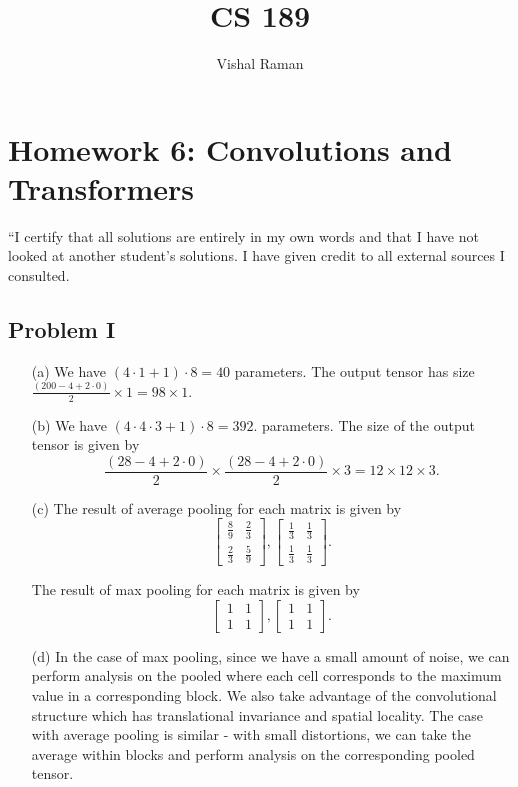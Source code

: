\documentclass[11pt]{scrartcl}
\begin{document}
\title{CS 189}
\author{Vishal Raman}

\section{Homework 6: Convolutions and Transformers}
“I certify that all solutions are entirely in my own words and that I have not looked at another student’s solutions. I have given credit to all external sources I consulted.
\subsection{Problem I}
\begin{itemize}
\item[(a)] We have $(4 \cdot 1 + 1) \cdot 8 = 40$ parameters.  The output tensor has size $\frac{(200 - 4 + 2 \cdot 0)}{2} \times 1= 98 \times 1.$

\item[(b)] We have $(4 \cdot 4 \cdot 3 + 1) \cdot 8 = 392$.   parameters. The size of the output tensor is given by $$\frac{(28 - 4 + 2 \cdot 0)}{2} \times \frac{(28 - 4 + 2 \cdot 0)}{2} \times 3 = 12 \times 12 \times 3.$$

\item[(c)]  The result of average pooling for each matrix is given by 
$$\begin{bmatrix}
\frac{8}{9} & \frac{2}{3} \\
\frac{2}{3} & \frac{5}{9}
\end{bmatrix},
\begin{bmatrix}
\frac{1}{3} & \frac{1}{3} \\
\frac{1}{3} & \frac{1}{3}
\end{bmatrix}.
$$

The result of max pooling for each matrix is given by 
$$\begin{bmatrix}
1 & 1 \\
1 & 1
\end{bmatrix},
\begin{bmatrix}
1 & 1\\
1 & 1
\end{bmatrix}.
$$
\item[(d)] In the case of max pooling, since we have a small amount of noise, we can perform analysis on the pooled where each cell corresponds to the maximum value in a corresponding block.   We also take advantage of the convolutional structure which has translational invariance and spatial locality.  The case with average pooling is similar - with small distortions, we can take the average within blocks and perform analysis on the corresponding pooled tensor.
\end{itemize}
\end{document}
